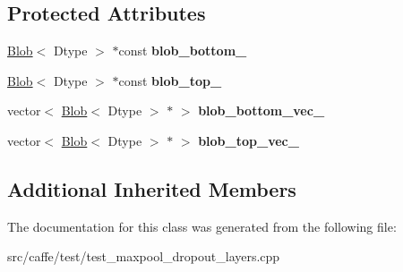 \subsection*{Protected Attributes}
\begin{DoxyCompactItemize}
\item 
\mbox{\label{classcaffe_1_1_max_pooling_dropout_test_ae15f0c6e23154040131c6fe65b2bc964}} 
\mbox{\hyperlink{classcaffe_1_1_blob}{Blob}}$<$ Dtype $>$ $\ast$const {\bfseries blob\+\_\+bottom\+\_\+}
\item 
\mbox{\label{classcaffe_1_1_max_pooling_dropout_test_a9801e5e7e4ecb3a8789559e1b2d0cb3d}} 
\mbox{\hyperlink{classcaffe_1_1_blob}{Blob}}$<$ Dtype $>$ $\ast$const {\bfseries blob\+\_\+top\+\_\+}
\item 
\mbox{\label{classcaffe_1_1_max_pooling_dropout_test_a50c3c85318700e52c3a7e572003042a5}} 
vector$<$ \mbox{\hyperlink{classcaffe_1_1_blob}{Blob}}$<$ Dtype $>$ $\ast$ $>$ {\bfseries blob\+\_\+bottom\+\_\+vec\+\_\+}
\item 
\mbox{\label{classcaffe_1_1_max_pooling_dropout_test_aca1cf72e3344a9bfc147c2cbc6bc5a6c}} 
vector$<$ \mbox{\hyperlink{classcaffe_1_1_blob}{Blob}}$<$ Dtype $>$ $\ast$ $>$ {\bfseries blob\+\_\+top\+\_\+vec\+\_\+}
\end{DoxyCompactItemize}
\subsection*{Additional Inherited Members}


The documentation for this class was generated from the following file\+:\begin{DoxyCompactItemize}
\item 
src/caffe/test/test\+\_\+maxpool\+\_\+dropout\+\_\+layers.\+cpp\end{DoxyCompactItemize}
